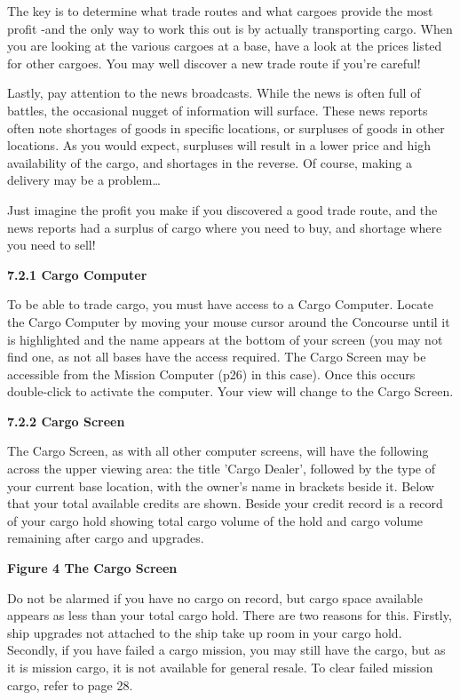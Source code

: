 \documentclass{article}
\begin{document}
The key is to determine what trade routes and what cargoes provide the most profit -and the only way to work this out is by actually transporting cargo. When you are looking at the various cargoes at a base, have a look at the prices listed for other cargoes. You may well discover a new trade route if you're careful! 

Lastly, pay attention to the news broadcasts. While the news is often full of battles, the occasional nugget of information will surface. These news reports often note shortages of goods in specific locations, or surpluses of goods in other locations. As you would expect, surpluses will result in a lower price and high availability of the cargo, and shortages in the reverse. Of course, making a delivery may be a problem\dots  

Just imagine the profit you make if you discovered a good trade route, and the news reports had a surplus of cargo where you need to buy, and shortage where you need to sell! 

\textbf{7.2.1 Cargo Computer }

To be able to trade cargo, you must have access to a Cargo Computer. Locate the Cargo Computer by moving your mouse cursor around the Concourse until it is highlighted and the name appears at the bottom of your screen (you may not find one, as not all bases have the access required. The Cargo Screen may be accessible from the Mission Computer (p26) in this case). Once this occurs double-click to activate the computer. Your view will change to the Cargo Screen. 

\textbf{7.2.2 Cargo Screen }

The Cargo Screen, as with all other computer screens, will have the following across the upper viewing area: the title 'Cargo Dealer', followed by the type of your current base location, with the owner's name in brackets beside it. Below that your total available credits are shown. Beside your credit record is a record of your cargo hold showing total cargo volume of the hold and cargo volume remaining after cargo and upgrades. 



\textbf{Figure 4 The Cargo Screen}

Do not be alarmed if you have no cargo on record, but cargo space available appears as less than your total cargo hold. There are two reasons for this. Firstly, ship upgrades not attached to the ship take up room in your cargo hold. Secondly, if you have failed a cargo mission, you may still have the cargo, but as it is mission cargo, it is not available for general resale. To clear failed mission cargo, refer to page 28. 
\end{document}
